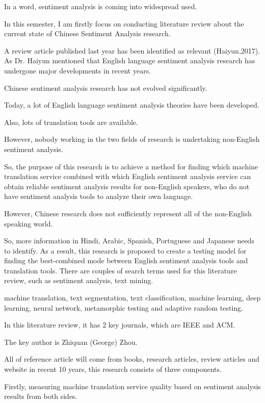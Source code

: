 \documentclass[conference]{IEEEtran}
\begin{document}
In a word, sentiment analysis is coming into widespread used.

In this semester, I am firstly focus on conducting literature review about the
current state of Chinese Sentiment Analysis research.

A review article published last year has been identified as relevant
(Haiyun,2017).
As Dr. Haiyun mentioned that English language sentiment analysis research has
undergone major developments in recent years.

Chinese sentiment analysis research has not evolved significantly.

Today, a lot of English language sentiment analysis theories have been
developed.

Also, lots of translation tools are available.

However, nobody working in the two fields of research is undertaking non-English
sentiment analysis.

So, the purpose of this research is to achieve a method for finding which
machine translation service combined with which English sentiment analysis
service can obtain reliable sentiment analysis results for non-English speakers,
who do not have sentiment analysis tools to analyze their own language.

However, Chinese research does not sufficiently represent all of the non-English
speaking world.

So, more information in Hindi, Arabic, Spanish, Portuguese and Japanese needs to
identify.
As a result, this research is proposed to create a testing model for finding the
best-combined mode between English sentiment analysis tools and translation
tools.
There are couples of search terms used for this literature review, such as
sentiment analysis, text mining.

machine translation, text segmentation, text classification, machine learning,
deep learning, neural network, metamorphic testing and adaptive random testing.

In this literature review, it has 2 key journals, which are IEEE and ACM.

The key author is Zhiquan (George) Zhou.

All of reference article will come from books, research articles, review
articles and website in recent 10 years, this research consists of three
components.

Firstly, measuring machine translation service quality based on sentiment
analysis results from both sides.
\end{document}
